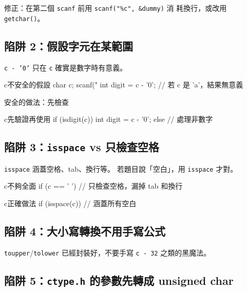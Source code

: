 
修正：在第二個 \texttt{scanf} 前用 \texttt{scanf("\%c", \&dummy)} 消
耗換行，或改用 \texttt{getchar()}。

\subsection{陷阱 2：假設字元在某範圍}

\texttt{c - '0'} 只在 \texttt{c} 確實是數字時有意義。

\begin{code}{c}{不安全的假設}
char c;
scanf("%
int digit = c - '0';  // 若 c 是 'a'，結果無意義
\end{code}

安全的做法：先檢查
\begin{code}{c}{先驗證再使用}
if (isdigit(c)) {
    int digit = c - '0';
} else {
    // 處理非數字
}
\end{code}

\subsection{陷阱 3：\texttt{isspace} vs 只檢查空格}

\texttt{isspace} 涵蓋空格、tab、換行等。 若題目說「空白」，用
\texttt{isspace} 才對。

\begin{code}{c}{不夠全面}
if (c == ' ')  // 只檢查空格，漏掉 tab 和換行
\end{code}

\begin{code}{c}{正確做法}
if (isspace(c))  // 涵蓋所有空白
\end{code}

\subsection{陷阱 4：大小寫轉換不用手寫公式}

\texttt{toupper}/\texttt{tolower} 已經封裝好，不要手寫 \texttt{c - 32}
之類的黑魔法。

\subsection[陷阱 5：ctype.h 參數要轉 unsigned char]{陷阱 5：\texttt{ctype.h} 的參數先轉成 unsigned char}

